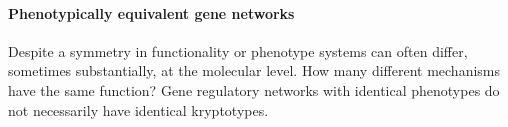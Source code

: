 \documentclass{article}
\newcommand{\plr}[1]{\todo[color=blue!25]{#1}}
\newcommand{\plr}[1]{{\color{blue}\it #1}}
\newcommand{\1}{\mathbbm{1}}
\begin{document}
  \paragraph{Phenotypically equivalent gene networks}

Despite a symmetry in functionality or phenotype systems can often differ, sometimes substantially, at the molecular level. 
How many different mechanisms have the same function? 
Gene regulatory networks with identical phenotypes do not necessarily have identical kryptotypes.
%
%
\end{document}
